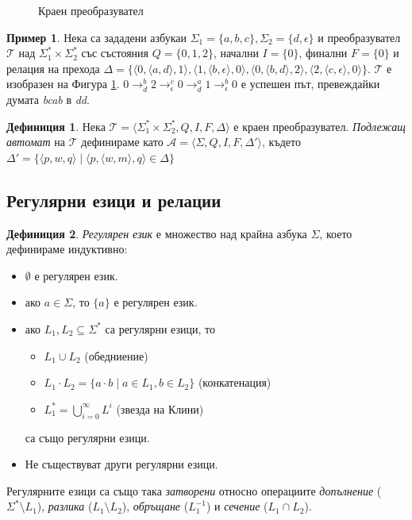\documentclass[12pt, oneside]{article}
\theoremstyle{definition}
\newtheorem{definition}{Дефиниция}[section]
\newtheorem{example}{Пример}[section]
\begin{document}
\begin{figure}[!htb]
	\centering
	
	\caption{Краен преобразувател}
	\label{fig:Fst}
\end{figure}

\begin{example}
	Нека са зададени азбукаи \( \Sigma_1 = \{ a,b,c \}, \Sigma_2 = \{ d,\epsilon \} \) и преобразувател \( \mathcal{T} \) над \( \Sigma_1^* \times \Sigma_2^*\) със състояния \( Q = \{ 0, 1, 2 \} \), начални \( I = \{ 0 \} \), финални \( F = \{ 0 \} \) и релация на прехода \( \Delta = \{ \langle 0, \langle a, d \rangle, 1 \rangle, \langle 1, \langle b, \epsilon \rangle, 0 \rangle, \langle 0, \langle b, d \rangle, 2 \rangle, \langle 2, \langle c, \epsilon \rangle, 0 \rangle \} \). \newline
	\( \mathcal{T} \) е изобразен на Фигура \ref{fig:Fst}. \newline
	\( 0 \to^{b}_{d} 2 \to^{c}_{\epsilon} 0 \to^{a}_{d} 1 \to^{b}_{\epsilon} 0 \) е успешен път, превеждайки думата \emph{bcab} в \emph{dd}.
\end{example}

\begin{definition}
	Нека \( \mathcal{T} = \langle \Sigma_1^* \times \Sigma_2^*, Q, I, F, \Delta \rangle \) е краен преобразувател. \emph{Подлежащ автомат} на \( \mathcal{T} \) дефинираме като \( \mathcal{A} = \langle \Sigma, Q, I, F, \Delta' \rangle \), където \( \Delta' = \{ \langle p, w, q \rangle \mid \langle p, \langle w, m \rangle, q \rangle \in \Delta \}\)
\end{definition}

\subsection{Регулярни езици и релации}

\begin{definition} 
	\emph{Регулярен език} е множество над крайна азбука \( \Sigma \), което дефинираме индуктивно:
	\begin{itemize}
		\item \( \emptyset \) е регулярен език.
		\item ако \( a \in \Sigma \), то \( \{ a \} \) е регулярен език.
		\item ако \( L_1, L_2 \subseteq \Sigma^* \) са регулярни езици, то 
		\begin{itemize}
			\item \( L_1 \cup L_2 \) (обедниение)
			\item \( L_1 \cdot L_2 = \{ a \cdot b \mid a \in L_1, b \in L_2 \} \) (конкатенация)
			\item \( L_1^* = \bigcup_{i=0}^{\infty}L^i \) (звезда на Клини)
		\end{itemize}
		 са също регулярни езици.
		\item Не съществуват други регулярни езици.
	\end{itemize}
	Регулярните езици са също така \emph{затворени} относно операциите \emph{допълнение} (\( \Sigma^* \setminus L_1 \)), \emph{разлика} (\( L_1 \setminus L_2 \)), \emph{обръщане} (\( L_1^{-1} \)) и \emph{сечение} (\( L_1 \cap L_2 \)).
\end{definition}
\end{document}
